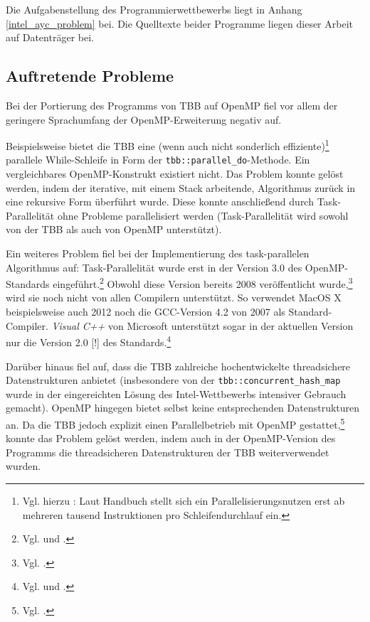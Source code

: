 \documentclass[11pt]{scrartcl}
\begin{document}
Die Aufgabenstellung des Programmierwettbewerbs liegt in Anhang \ref{intel_ayc_problem} bei. Die Quelltexte beider
Programme liegen dieser Arbeit auf Datenträger bei.

\subsection{Auftretende Probleme}

Bei der Portierung des Programms von TBB auf OpenMP fiel vor allem der geringere Sprachumfang der OpenMP-Erweiterung
negativ auf.

Beispielsweise bietet die TBB eine (wenn auch nicht sonderlich effiziente)\footnote{Vgl. hierzu \cite{intel_cook_2012}:
Laut Handbuch stellt sich ein Parallelisierungsnutzen erst ab mehreren tausend Instruktionen pro Schleifendurchlauf
ein.} parallele While-Schleife in Form der \texttt{tbb::parallel\_do}-Methode. Ein vergleichbares OpenMP-Konstrukt
existiert nicht. Das Problem konnte gelöst werden, indem der iterative, mit einem Stack arbeitende, Algorithmus zurück
in eine rekursive Form überführt wurde. Diese konnte anschließend durch Task-Parallelität ohne Probleme parallelisiert
werden (Task-Parallelität wird sowohl von der TBB als auch von OpenMP unterstützt).

Ein weiteres Problem fiel bei der Implementierung des task-parallelen Algorithmus auf: Task-Parallelität wurde erst in
der Version 3.0 des OpenMP-Standards eingeführt.\footnote{Vgl. \cite[S.~134]{openmp08} und
\cite[S.~406ff]{ayguade_design_2009}.} Obwohl diese Version bereits 2008 veröffentlicht wurde,\footnote{Vgl.
\cite{openmp.org_openmp_2012}.} wird sie noch nicht von allen Compilern unterstützt. So verwendet MacOS X
beispielsweise auch 2012 noch die GCC-Version 4.2 von 2007 als Standard-Compiler. \emph{Visual C++} von Microsoft
unterstützt sogar in der aktuellen Version nur die Version 2.0 [!] des Standards.\footnote{Vgl.
\cite{openmp.org_openmp_2012-2} und
\cite{microsoft_openmp_2012}.}

Darüber hinaus fiel auf, dass die TBB zahlreiche hochentwickelte threadsichere Datenstrukturen anbietet (insbesondere
von der \texttt{tbb::concurrent\_hash\_map} wurde in der eingereichten Lösung des Intel-Wettbewerbs intensiver Gebrauch
gemacht). OpenMP hingegen bietet selbst keine entsprechenden Datenstrukturen an. Da die TBB jedoch explizit einen
Parallelbetrieb mit OpenMP gestattet,\footnote{Vgl. \cite{intel_mixing_2012}.} konnte das Problem gelöst werden, indem
auch in der OpenMP-Version des Programms die threadsicheren Datenstrukturen der TBB weiterverwendet wurden.
\end{document}
